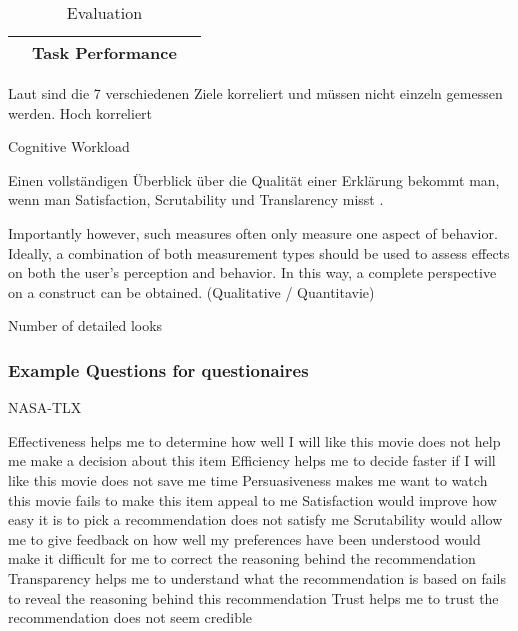 \begin{table}[htb!]
\begin{center}
\begin{tabular}{|p{}|p{}|p{}|}
                        & Task Performance                  & \cite{waa_evaluating_2021}  \cite{mucha_interfaces_2021}  
                                                            \cite{abdulrahman_belief-based_2019} 
                                                            \cite{zolotas_towards_2019} \cite{martin_developing_2019} 
                                                            \cite{martin_evaluating_2021} \cite{gunning2019darpa} \\
            \hline
        \end{tabular}
    \end{center}
    \caption{Evaluation}
    \label{tab:evaluation_of_explanations}
\end{table}



Laut \cite{balog_measuring_2020} sind die 7 verschiedenen Ziele korreliert und müssen nicht einzeln gemessen werden. Hoch korreliert \cite{kouki_user_2017}

Cognitive Workload \cite{wiegand2019drive, wiegand_id_2020}

Einen vollständigen Überblick über die Qualität einer Erklärung bekommt man, wenn man Satisfaction, Scrutability und Translarency misst \cite{balog_measuring_2020}.

\glqq Importantly however, such measures often only measure one aspect of behavior. Ideally, a combination of both measurement types should be used to assess effects on both the user’s perception and behavior. In this way, a complete perspective on a construct can be obtained.\grqq{} (Qualitative / Quantitavie) \cite{waa_evaluating_2021}

Number of detailed looks

\subsubsection{Example Questions for questionaires}

NASA-TLX \cite{tsai_evaluating_2019}

Effectiveness helps me to determine how well I will like this movie does not help me make a decision about this item Efficiency helps me to decide faster if I will like this movie does not save me time Persuasiveness makes me want to watch this movie fails to make this item appeal to me Satisfaction would improve how easy it is to pick a recommendation does not satisfy me Scrutability would allow me to give feedback on how well my preferences have been understood would make it difficult for me to correct the reasoning behind the recommendation Transparency helps me to understand what the recommendation is based on fails to reveal the reasoning behind this recommendation Trust helps me to trust the recommendation does not seem credible \cite{balog_measuring_2020}

